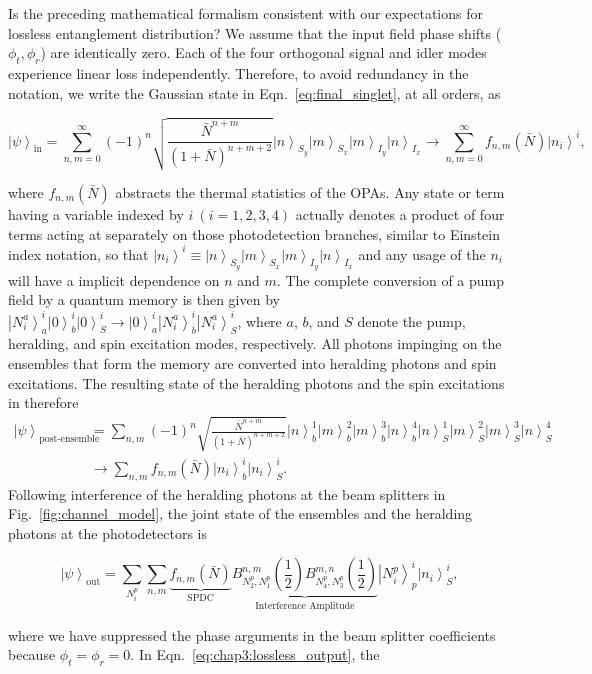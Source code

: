 \documentclass[aps,twocolumn,secnumarabic,amsmath,amssymb,pra,groupedaddress,
showpacs, showkeys]{revtex4-1}
\newcommand{\ket}[1]{\left|#1\right\rangle}
\newcommand{\pna}[1]{\left(#1\right)}
\newcommand{\eqn}[1]{
\begin{equation}
	#1
\end{equation}
}
\begin{document}
Is the preceding mathematical formalism consistent with our expectations for
lossless entanglement distribution? We assume that the input field phase shifts
($\phi_t,\phi_r$) are identically zero. Each of the four orthogonal signal and
idler modes experience linear loss independently. Therefore, to avoid
redundancy in the notation, we write the Gaussian state in
Eqn.~\ref{eq:final_singlet}, at all orders, as 
\eqn{
\ket{\psi}_{\textrm{in}}=\sum_{n,m=0}^{\infty} \pna{-1}^n\sqrt{\frac{\bar{N}^{n+m}}{\pna{1+\bar{N}}^{n+m+2}}}\ket{n}_{S_y}\ket{m}_{S_x}\ket{m}_{I_y}\ket{n}_{I_x} 
 \rightarrow \sum_{n,m=0}^{\infty} f_{n,m}\pna{\bar{N}}\ket{n_i}^i,
}
where $f_{n,m}\pna{\bar{N}}$ abstracts the thermal statistics of the OPAs. Any
state or term having a variable indexed by $i~\pna{i=1,2,3,4}$ actually denotes
a product of four terms acting at separately on those photodetection branches,
similar to Einstein index notation, so that $\ket{n_i}^i\equiv
\ket{n}_{S_y}\ket{m}_{S_x}\ket{m}_{I_y}\ket{n}_{I_x}$ and any usage of the
$n_i$ will have a implicit dependence on $n$ and $m$. The complete conversion
of a pump field by a quantum memory is then given by
$\ket{N^a_i}_a^i\ket{0}_b^i\ket{0}_S^i\rightarrow\ket{0}_a^i\ket{N^a_i}_b^i\ket{N^a_i}_S^i$,
where $a$, $b$, and $S$ denote the pump, heralding, and spin excitation modes,
respectively. All photons impinging on the ensembles that form the memory are
converted into heralding photons and spin excitations. The resulting state of
the heralding photons and the spin excitations in therefore
\begin{align}
\ket{\psi}_{\textrm{post-ensemble}}& = \sum_{n,m} \pna{-1}^n\sqrt{\frac{\bar{N}^{n+m}}{\pna{1+\bar{N}}^{n+m+2}}} 
\ket{n}^1_b \ket{m}^2_b \ket{m}^3_b \ket{n}^4_b 
\ket{n}^1_S \ket{m}^2_S \ket{m}^3_S \ket{n}^4_S  \nonumber  \\
& \rightarrow \sum_{n,m}f_{n,m}\pna{\bar{N}}\ket{n_i}^i_b\ket{n_i}^i_S.
\end{align}
Following interference of the heralding photons at the beam splitters in
Fig.~\ref{fig:channel_model}, the joint state of the ensembles and the
heralding photons at the photodetectors is
\eqn{
\ket{\psi}_{\textrm{out}} =\sum_{N_i^p}\sum_{n,m} \underbrace{f_{n,m}\pna{\bar{N}}}_\text{SPDC} \underbrace{B_{N_2^p,N_1^p}^{n,m}\pna{\frac{1}{2}}  
B_{N_4^p,N_3^p}^{m,n}\pna{\frac{1}{2}}}_\text{Interference Amplitude}\ket{N_i^p}^i_p\ket{n_i}^i_S, \label{eq:chap3:lossless_output}
}
where we have suppressed the phase arguments in the beam splitter coefficients
because $\phi_t=\phi_r=0$. In Eqn.~\ref{eq:chap3:lossless_output}, the
\end{document}
